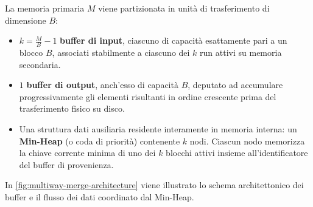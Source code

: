La memoria primaria $M$ viene partizionata in unità di trasferimento di dimensione $B$:
\begin{itemize}
  \item $k = \frac{M}{B} - 1$ \textbf{buffer di input}, ciascuno di capacità esattamente pari a un blocco $B$, associati stabilmente a ciascuno dei $k$ run attivi su memoria secondaria.
  \item $1$ \textbf{buffer di output}, anch'esso di capacità $B$, deputato ad accumulare progressivamente gli elementi risultanti in ordine crescente prima del trasferimento fisico su disco.
  \item Una struttura dati ausiliaria residente interamente in memoria interna: un \textbf{Min-Heap} (o coda di priorità) contenente $k$ nodi. Ciascun nodo memorizza la chiave corrente minima di uno dei $k$ blocchi attivi insieme all'identificatore del buffer di provenienza.
\end{itemize}

In \autoref{fig:multiway-merge-architecture} viene illustrato lo schema architettonico dei buffer e il flusso dei dati coordinato dal Min-Heap.

